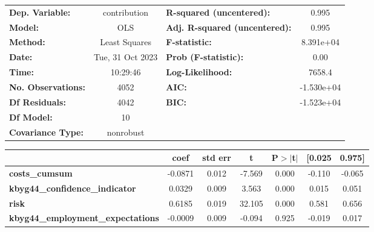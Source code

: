 \begin{center}
\begin{tabular}{lclc}
\toprule
\textbf{Dep. Variable:}                   &   contribution   & \textbf{  R-squared (uncentered):}      &     0.995   \\
\textbf{Model:}                           &       OLS        & \textbf{  Adj. R-squared (uncentered):} &     0.995   \\
\textbf{Method:}                          &  Least Squares   & \textbf{  F-statistic:       }          & 8.391e+04   \\
\textbf{Date:}                            & Tue, 31 Oct 2023 & \textbf{  Prob (F-statistic):}          &     0.00    \\
\textbf{Time:}                            &     10:29:46     & \textbf{  Log-Likelihood:    }          &    7658.4   \\
\textbf{No. Observations:}                &        4052      & \textbf{  AIC:               }          & -1.530e+04  \\
\textbf{Df Residuals:}                    &        4042      & \textbf{  BIC:               }          & -1.523e+04  \\
\textbf{Df Model:}                        &          10      & \textbf{                     }          &             \\
\textbf{Covariance Type:}                 &    nonrobust     & \textbf{                     }          &             \\
\bottomrule
\end{tabular}
\begin{tabular}{lcccccc}
                                          & \textbf{coef} & \textbf{std err} & \textbf{t} & \textbf{P$> |$t$|$} & \textbf{[0.025} & \textbf{0.975]}  \\
\midrule
\textbf{costs\_cumsum}                    &      -0.0871  &        0.012     &    -7.569  &         0.000        &       -0.110    &       -0.065     \\
\textbf{kbyg44\_confidence\_indicator}    &       0.0329  &        0.009     &     3.563  &         0.000        &        0.015    &        0.051     \\
\textbf{risk}                             &       0.6185  &        0.019     &    32.105  &         0.000        &        0.581    &        0.656     \\
\textbf{kbyg44\_employment\_expectations} &      -0.0009  &        0.009     &    -0.094  &         0.925        &       -0.019    &        0.017     \\

\end{tabular}
\end{center}

